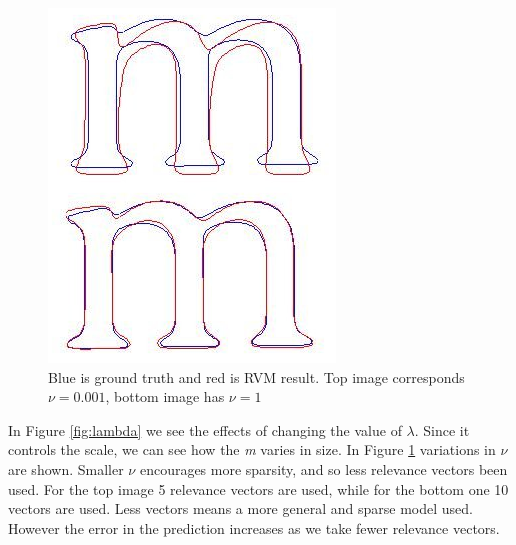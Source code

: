 \documentclass[12pt]{article}
\begin{document}
\begin{figure}[h]
\begin{minipage}[t]{.45\textwidth}
		\label{fig:lambda}
	\end{minipage}\hfill
	\begin{minipage}[t]{.45\textwidth}
		\centering
		\includegraphics[scale=0.5]{images/nu1_0_01}
		\caption{Blue is ground truth and red is RVM result. Top image corresponds  $\nu=0.001$, bottom image has $\nu=1$}
		\label{fig:nu}
	\end{minipage}
\end{figure}

In Figure \ref{fig:lambda} we see the effects of changing the value of $\lambda$.
Since it controls the scale, we can see how the \emph{m} varies in size.
In Figure \ref{fig:nu} variations in $\nu$ are shown.
Smaller $\nu$ encourages more sparsity, and so less relevance vectors been used.
For the top image 5 relevance vectors are used, while for the bottom one 10 vectors are used.
Less vectors means a more general and sparse model used. 
However the error in the prediction increases as we take fewer relevance vectors. 

\end{document}
